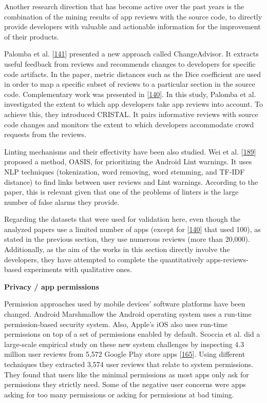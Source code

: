 \documentclass[]{book}
\begin{document}
Another research direction that has become active over the past years is
the combination of the mining results of app reviews with the source
code, to directly provide developers with valuable and actionable
information for the improvement of their products.

Palomba et al.
{[}\protect\hyperlink{ref-palomba2017recommending}{141}{]} presented a
new approach called ChangeAdvisor. It extracts useful feedback from
reviews and recommends changes to developers for specific code
artifacts. In the paper, metric distances such as the Dice coefficient
are used in order to map a specific subset of reviews to a particular
section in the source code. Complementary work was presented in
{[}\protect\hyperlink{ref-palomba2018crowdsourcing}{140}{]}. In this
study, Palomba et al. investigated the extent to which app developers
take app reviews into account. To achieve this, they introduced CRISTAL.
It pairs informative reviews with source code changes and monitors the
extent to which developers accommodate crowd requests from the reviews.

Linting mechanisms and their effectivity have been also studied. Wei et
al. {[}\protect\hyperlink{ref-wei2017oasis}{189}{]} proposed a method,
OASIS, for prioritizing the Android Lint warnings. It uses NLP
techniques (tokenization, word removing, word stemming, and TF-IDF
distance) to find links between user reviews and Lint warnings.
According to the paper, this is relevant given that one of the problems
of linters is the large number of false alarms they provide.

Regarding the datasets that were used for validation here, even though
the analyzed papers use a limited number of apps (except for
{[}\protect\hyperlink{ref-palomba2018crowdsourcing}{140}{]} that used
100), as stated in the previous section, they use numerous reviews (more
than 20,000). Additionally, as the aim of the works in this section
directly involve the developers, they have attempted to complete the
quantitatively apps-reviews-based experiments with qualitative ones.

\textbf{Privacy / app permissions}

Permission approaches used by mobile devices' software platforms have
been changed. Android Marshmallow the Android operating system uses a
run-time permission-based security system. Also, Apple's iOS also uses
run-time permissions on top of a set of permissions enabled by default.
Scoccia et al. did a large-scale empirical study on these new system
challenges by inspecting 4.3 million user reviews from 5,572 Google Play
store apps {[}\protect\hyperlink{ref-scoccia2018investigation}{165}{]}.
Using different techniques they extracted 3,574 user reviews that relate
to system permissions. They found that users like the minimal
permissions as most apps only ask for permissions they strictly need.
Some of the negative user concerns were apps asking for too many
permissions or asking for permissions at bad timing.
\end{document}
